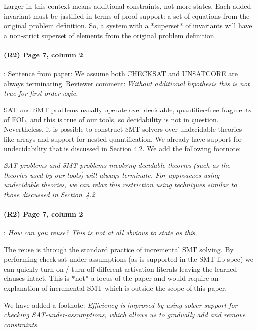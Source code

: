 \documentclass{article}
\begin{document}
\noindent Larger in this context means additional constraints, not more states.  Each added invariant must be justified in terms of proof support: a set of equations from the original problem definition. So, a system with a *superset* of invariants will have a non-strict superset of elements from the original problem definition.



\paragraph{(R2) Page 7, column 2}: Sentence from paper: We assume both CHECKSAT and UNSATCORE are always terminating.  Reviewer comment:
\textit{Without additional hipothesis this is not true
for first order logic.}
\vspace{0.05in}

\noindent SAT and SMT problems usually operate over decidable, quantifier-free fragments of FOL, and this is true of our tools, so decidability is not in question.  Nevertheless, it is possible to construct SMT solvers over undecidable theories like arrays and support for nested quantification. We already have support for undecidability that is discussed in Section 4.2. We add the following footnote:

\textit{SAT problems and SMT problems involving decidable theories (such as the theories used by our tools) will always terminate.  For approaches using undecidable theories, we can relax this restriction using  techniques similar to those discussed in Section~4.2}


\paragraph{(R2) Page 7, column 2}: \textit{How can you reuse? This is not at all obvious to state as this.}
\vspace{0.05in}

\noindent The reuse is through the standard practice of incremental SMT solving. By performing check-sat under assumptions (as is supported in the SMT lib spec) we can quickly turn on / turn off different activation literals leaving the learned clauses intact. This is
*not* a focus of the paper and would require an explanation of incremental SMT which is outside the scope of this paper.

We have added a footnote: \textit{Efficiency is improved by using solver support for checking SAT-under-assumptions, which allows us to gradually add and remove constraints.}
\end{document}
